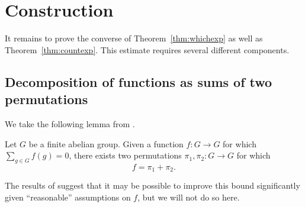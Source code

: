 \section{Construction}
\label{sec:construct}
It remains to prove the converse of Theorem~\ref{thm:whichexp}
as well as Theorem~\ref{thm:countexp}.
This estimate requires several different components.

\subsection{Decomposition of functions as sums of two permutations}
We take the following lemma from \cite{SL2005C7}.
\begin{lemma}
	\label{lem:2005C7}
	Let $G$ be a finite abelian group.
	Given a function $f \colon G \to G$
	for which $\sum_{g \in G} f(g) = 0$,
	there exists two permutations $\pi_1, \pi_2 \colon G \to G$
	for which \[ f = \pi_1 + \pi_2. \]
\end{lemma}
The results of \cite[Theorem 1.3]{eberhard} suggest
that it may be possible to improve this bound significantly
given ``reasonable'' assumptions on $f$,
but we will not do so here.

